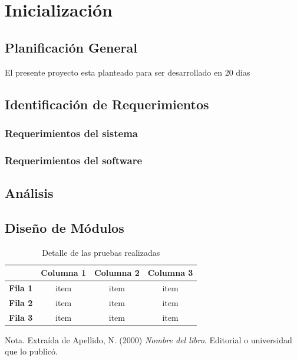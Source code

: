 \chapter{Inicialización}

\section{Planificación General}
El presente proyecto esta planteado para ser desarrollado en 20 dias

\section{Identificación de Requerimientos}
\subsection{Requerimientos del sistema}
\subsection{Requerimientos del software}

\section{Análisis}
\section{Diseño de Módulos}

\begin{table}[H]
    \caption{Detalle de las pruebas realizadas}
    \label{tabla:ejemplo}
    \begin{center}
        \begin{tabular}{c|c|c|c|}
            \cline{2-4}
            & \textbf{Columna 1} & \textbf{Columna 2} & \textbf{Columna 3} \\ \hline
            \multicolumn{1}{|c|}{\textbf{Fila 1}} & item               & item               & item               \\ \hline
            \multicolumn{1}{|c|}{\textbf{Fila 2}} & item               & item               & item               \\ \hline
            \multicolumn{1}{|c|}{\textbf{Fila 3}} & item               & item               & item               \\ \hline
        \end{tabular}
    \end{center}
    Nota. Extraída de Apellido, N. (2000) \textit{Nombre del libro}.
    Editorial o universidad que lo publicó.
\end{table}

